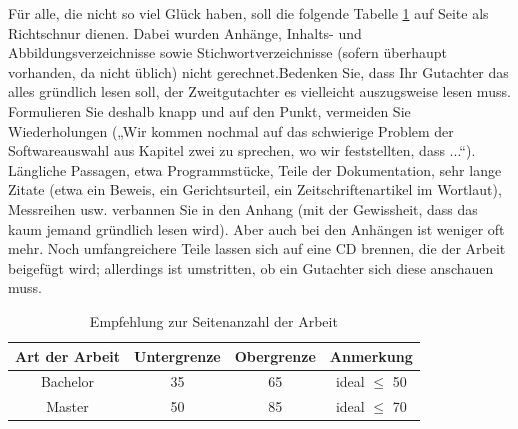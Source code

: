 Für alle, die nicht so viel Glück haben, soll die folgende Tabelle \ref{tab:tabelle-2} auf Seite \pageref{tab:tabelle-2} als Richtschnur
dienen. Dabei wurden Anhänge, Inhalts- und Abbildungsverzeichnisse sowie Stichwortverzeichnisse (sofern überhaupt vorhanden, da nicht üblich) nicht gerechnet.Bedenken Sie, dass Ihr Gutachter das alles gründlich lesen soll, der Zweitgutachter es vielleicht
auszugsweise lesen muss. Formulieren Sie deshalb knapp und auf den Punkt, vermeiden Sie Wiederholungen („Wir kommen nochmal auf das schwierige Problem der Softwareauswahl aus
Kapitel zwei zu sprechen, wo wir feststellten, dass ...“).
Längliche Passagen, etwa Programmstücke, Teile der Dokumentation, sehr lange Zitate (etwa ein Beweis, ein Gerichtsurteil, ein Zeitschriftenartikel im Wortlaut), Messreihen usw.
verbannen Sie in den Anhang (mit der Gewissheit, dass das kaum jemand gründlich lesen wird).
Aber auch bei den Anhängen ist weniger oft mehr. Noch umfangreichere Teile lassen sich auf
eine CD brennen, die der Arbeit beigefügt wird; allerdings ist umstritten, ob ein Gutachter sich
diese anschauen muss.

\begin{table}[tb]
  \centering
  \begin{tabular}{cccc}
    \toprule
    \textbf{Art der Arbeit} & \textbf{Untergrenze} & \textbf{Obergrenze} & \textbf{Anmerkung} \\
		\midrule
    Bachelor & 35 & 65 & ideal $\leq$ 50 \\
    Master & 50 & 85 & ideal $\leq$ 70 \\
    \bottomrule
  \end{tabular}
  \caption{Empfehlung zur Seitenanzahl der Arbeit}
  \label{tab:tabelle-2}
\end{table}


